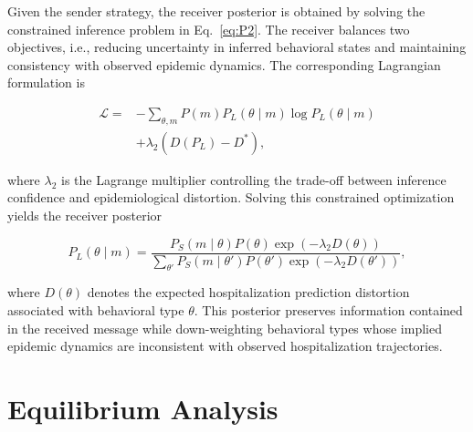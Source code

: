\documentclass[sigconf,review]{acmart}
\begin{document}
Given the sender strategy, the receiver posterior is obtained by solving
the constrained inference problem in Eq.~\eqref{eq:P2}. The receiver balances two objectives, i.e., reducing uncertainty in inferred behavioral states and maintaining consistency with observed epidemic dynamics.
The corresponding Lagrangian formulation is

\begin{equation}
\begin{aligned}
\mathcal{L}
=&
-\sum_{\theta,m}
P(m)P_L(\theta\mid m)
\log P_L(\theta\mid m)
\\
&
+\lambda_2
\left(
D(P_L)-D^*
\right),
\end{aligned}
\label{eq:Lagrangian_receiver}
\end{equation}

where $\lambda_2$ is the Lagrange multiplier controlling the trade-off between inference confidence and epidemiological distortion.
Solving this constrained optimization yields the receiver posterior

\begin{equation}
P_L(\theta\mid m)
=
\frac{
P_S(m\mid\theta)P(\theta)
\exp(-\lambda_2D(\theta))
}
{
\sum_{\theta'}
P_S(m\mid\theta')
P(\theta')
\exp(-\lambda_2D(\theta'))
},
\label{eq:posterior_solution}
\end{equation}

where $D(\theta)$ denotes the expected hospitalization prediction distortion associated with behavioral type $\theta$. This posterior preserves information contained in the received message
while down-weighting behavioral types whose implied epidemic dynamics
are inconsistent with observed hospitalization trajectories.


\section{Equilibrium Analysis}


\end{document}

